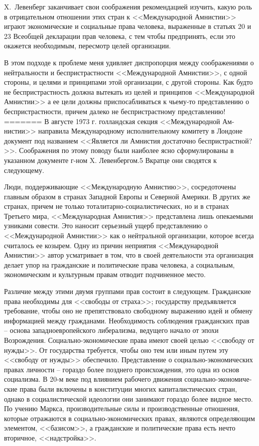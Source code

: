 \documentclass{book}
\begin{document}
{X.~Левенберг заканчивает свои соображения рекоменда­цией изучить, какую роль в отрицательном отношении этих стран к <<Международной Амнистии>> играют экономические и со­циальные права человека, выраженные в статьях 20 и 23 Всеоб­щей декларации прав человека, с тем чтобы предпринять, ес­ли это окажется необходимым, пересмотр целей организации.

В этом подходе к проблеме меня удивляет диспропорция между соображениями о нейтральности и беспристрастности <<Международной Амнистии>>, с одной стороны, и целями и прин­ципами этой организации, с другой стороны. Как будто не беспристрастность должна вытекать из целей и принципов <<Международной Амнистии>> а ее цели должны приспосабливаться к чьему‑то представлению о беспристрастности, причем далеко не беспристрастному представлению!
=======
В августе 1973 г. голландская секция <<Международной Ам­нистии>> направила Международному исполнительному комитету в Лондоне документ под названием <<Является ли Амнистия достаточно беспристрастной?>>. Соображения по этому поводу были наиболее ясно сформулированы в указанном документе г-ном X. Левенбергом.5 Вкратце они сводятся к следующему.

Люди, поддерживающие <<Международную Амнистию>>, сосре­доточены главным образом в странах Западной Европы и Се­верной Америки. В других же странах, причем не только тота­литарно-социалистических, но и в странах Третьего мира, <<Международная Амнистия>> представлена лишь опекаемыми узника­ми совести. Это наносит серьезный ущерб представлению о <<Международной Амнистии>> как о нейтральной организации, которое всегда считалось ее козырем. Одну из причин непри­ятия <<Международной Амнистии>> автор усматривает в том, что в своей деятельности эта организация делает упор на граждан­ские и политические права человека, а социальным, экономи­ческим и культурным правам отводит подчиненное место.

Различие между этими двумя группами прав состоит в сле­дующем. Гражданские права необходимы для <<свободы от страха>>; государству предъявляется требование, чтобы оно не препятствовало свободному выражению идей и обмену информацией между гражданами. Необходимость соблюде­ния гражданских прав -- основа западноевропейского либера­лизма, ведущего начало от эпохи Возрождения. Социально-экономические права имеют своей целью <<свободу от нуж­ды>>. От государства требуется, чтобы оно тем или иным пу­тем эту  <<свободу от нужды>> обеспечило. Представление о социально-экономических правах личности -- гораздо более позднего происхождения, это одна из основ социализма. В 20-м веке под влиянием рабочего движения социально-экономиче­ские права были включены в конституции многих капиталисти­ческих стран, однако в социалистической идеологии они зани­мают гораздо более видное место. По учению Маркса, произ­водительные силы и производственные отношения, которые отражаются в социально-экономических правах, являются определяющим 
элементом, <<базисом>>, а гражданские и поли­тические права есть нечто вторичное, <<надстройка>>.

}
\end{document}
